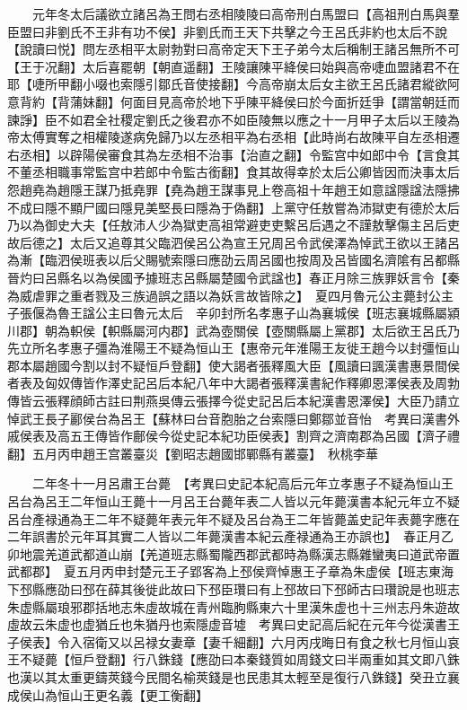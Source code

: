 　　元年冬太后議欲立諸呂為王問右丞相陵陵曰高帝刑白馬盟曰【高祖刑白馬與羣臣盟曰非劉氏不王非有功不侯】非劉氏而王天下共擊之今王呂氏非約也太后不說【說讀曰悦】問左丞相平太尉勃對曰高帝定天下王子弟今太后稱制王諸呂無所不可【王于况翻】太后喜罷朝【朝直遥翻】王陵讓陳平絳侯曰始與高帝啑血盟諸君不在耶【啑所甲翻小啜也索隱引鄒氏音使接翻】今高帝崩太后女主欲王呂氏諸君縱欲阿意背約【背蒲妹翻】何面目見高帝於地下乎陳平絳侯曰於今面折廷爭【謂當朝廷而諫諍】臣不如君全社稷定劉氏之後君亦不如臣陵無以應之十一月甲子太后以王陵為帝太傅實奪之相權陵遂病免歸乃以左丞相平為右丞相【此時尚右故陳平自左丞相遷右丞相】以辟陽侯審食其為左丞相不治事【治直之翻】令監宫中如郎中令【言食其不董丞相職事常監宫中若郎中令監古銜翻】食其故得幸於太后公卿皆因而決事太后怨趙堯為趙隱王謀乃抵堯罪【堯為趙王謀事見上卷高祖十年趙王如意諡隱諡法隱拂不成曰隱不顯尸國曰隱見美堅長曰隱為于偽翻】上黨守任敖嘗為沛獄吏有德於太后乃以為御史大夫【任敖沛人少為獄吏高祖常避吏吏繫呂后遇之不謹敖擊傷主呂后吏故后德之】太后又追尊其父臨泗侯呂公為宣王兄周呂令武侯澤為悼武王欲以王諸呂為漸【臨泗侯班表以后父賜號索隱曰應劭云周呂國也按周及呂皆國名濟隂有呂都縣晉灼曰呂縣名以為侯國予據班志呂縣屬楚國令武諡也】春正月除三族罪妖言令【秦為威虐罪之重者戮及三族過誤之語以為妖言故皆除之】　夏四月魯元公主薨封公主子張偃為魯王諡公主曰魯元太后　辛卯封所名孝惠子山為襄城侯【班志襄城縣屬潁川郡】朝為軹侯【軹縣屬河内郡】武為壺關侯【壺關縣屬上黨郡】太后欲王呂氏乃先立所名孝惠子彊為淮陽王不疑為恒山王【惠帝元年淮陽王友徙王趙今以封彊恒山郡本屬趙國今割以封不疑恒戶登翻】使大謁者張釋風大臣【風讀曰諷漢書惠景間侯者表及匈奴傳皆作澤史記呂后本紀八年中大謁者張釋漢書紀作釋卿恩澤侯表及周勃傳皆云張釋顔師古註曰荆燕吳傳云張擇今從史記呂后本紀漢書恩澤侯】大臣乃請立悼武王長子酈侯台為呂王【蘇林曰台音胞胎之台索隱曰鄭鄒並音怡　考異曰漢書外戚侯表及高五王傳皆作鄜侯今從史記本紀功臣侯表】割齊之濟南郡為呂國【濟子禮翻】五月丙申趙王宫叢臺災【劉昭志趙國邯鄲縣有叢臺】　秋桃李華

　　二年冬十一月呂肅王台薨　【考異曰史記本紀高后元年立孝惠子不疑為恒山王呂台為呂王二年恒山王薨十一月呂王台薨年表二人皆以元年薨漢書本紀元年立不疑呂台產禄通為王二年不疑薨年表元年不疑及呂台為王二年皆薨盖史記年表薨字應在二年誤書於元年耳其實二人皆以二年薨漢書本紀云產禄通為王亦誤也】　春正月乙卯地震羌道武都道山崩【羌道班志縣蜀隴西郡武都時為縣漢志縣雜蠻夷曰道武帝置武都郡】　夏五月丙申封楚元王子郢客為上邳侯齊悼惠王子章為朱虚侯【班志東海下邳縣應劭曰邳在薛其後徙此故曰下邳臣瓚曰有上邳故曰下邳師古曰瓚說是也班志朱虚縣屬琅邪郡括地志朱虛故城在青州臨朐縣東六十里漢朱虚也十三州志丹朱遊故虛故云朱虚也虚猶丘也朱猶丹也索隱虚音墟　考異曰史記高后紀在元年今從漢書王子侯表】令入宿衛又以呂禄女妻章【妻千細翻】六月丙戌晦日有食之秋七月恒山哀王不疑薨【恒戶登翻】行八銖錢【應劭曰本秦錢質如周錢文曰半兩重如其文即八銖也漢以其太重更鑄莢錢今民間名榆莢錢是也民患其太輕至是復行八銖錢】癸丑立襄成侯山為恒山王更名義【更工衡翻】

